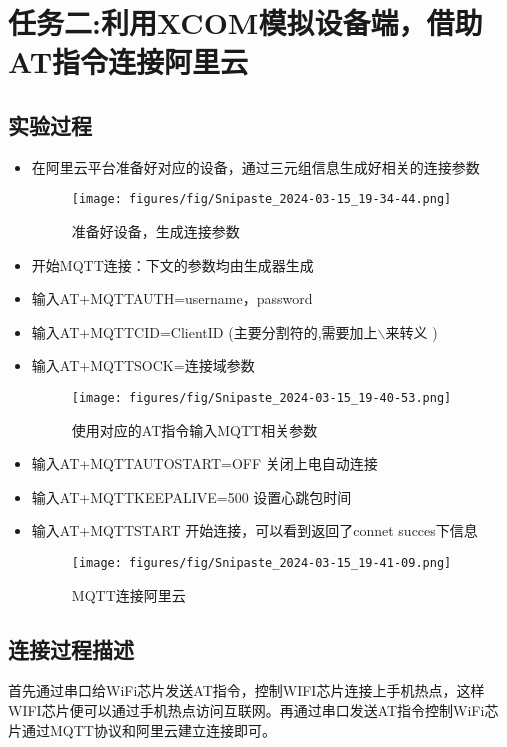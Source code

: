 \documentclass[12pt,hyperref,a4paper,UTF8]{ctexart}
\begin{document}
\section{任务二:利用XCOM模拟设备端，借助AT指令连接阿里云}

\subsection{实验过程}
\begin{itemize}[]
    \item 在阿里云平台准备好对应的设备，通过三元组信息生成好相关的连接参数
    \begin{figure}[H]
        \centering
        \texttt{[image: figures/fig/Snipaste\_2024-03-15\_19-34-44.png]}
        \caption{准备好设备，生成连接参数}
        \label{fig:enter-label}
    \end{figure}

    \item 开始MQTT连接：下文的参数均由生成器生成 
    \item 输入AT+MQTTAUTH=username，password
    \item 输入AT+MQTTCID=ClientID (主要分割符的,需要加上$\backslash$来转义 )
    \item 输入AT+MQTTSOCK=连接域参数
    \begin{figure}[H]
        \centering
        \texttt{[image: figures/fig/Snipaste\_2024-03-15\_19-40-53.png]}
        \caption{使用对应的AT指令输入MQTT相关参数}
        \label{fig:enter-label}
    \end{figure} 

    \item 输入AT+MQTTAUTOSTART=OFF 关闭上电自动连接
    \item 输入AT+MQTTKEEPALIVE=500 设置心跳包时间
    \item 输入AT+MQTTSTART 开始连接，可以看到返回了connet succes下信息
    \begin{figure}[H]
        \centering
        \texttt{[image: figures/fig/Snipaste\_2024-03-15\_19-41-09.png]}
        \caption{MQTT连接阿里云}
        \label{fig:enter-label}
    \end{figure}

\end{itemize}
\subsection*{连接过程描述}
    首先通过串口给WiFi芯片发送AT指令，控制WIFI芯片连接上手机热点，这样WIFI芯片便可以通过手机热点访问互联网。再通过串口发送AT指令控制WiFi芯片通过MQTT协议和阿里云建立连接即可。
\end{document}
